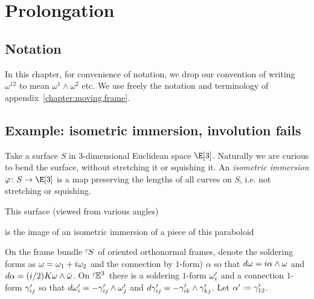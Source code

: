 \chapter{Prolongation}\label{chapter:prolongation}
%
\section{Notation}In this chapter, for convenience of notation, we drop our convention of writing \(\omega^{12}\) to mean \(\omega^1\wedge\omega^2\) etc.
We use freely the notation and terminology of appendix~\ref{chapter:moving.frame}. 
\section{Example: isometric immersion, involution fails}
Take a surface \(S\) in \(3\)-dimensional Euclidean space \(\E[3]\).
Naturally we are curious to bend the surface, without stretching it or squishing it.
An \emph{isometric immersion} \(\varphi \colon S \to \E[3]\) is a map preserving the lengths of all curves on \(S\), i.e. not stretching or squishing.
\begin{example}This surface (viewed from various angles)
\begin{center}
\end{center}
is the image of an isometric immersion of a piece of this paraboloid
\begin{center}
\end{center}
\end{example}
On the frame bundle \(\left\ulcorner\!S\right.\) of oriented orthonormal frames, denote the soldering forms as \(\omega=\omega_1+i\omega_2\) and the connection by \(1\)-form) \(\alpha\) so that \(d\omega=i\alpha \wedge \omega\) and \(d\alpha=(i/2)K\omega \wedge \bar{\omega}\).
On \(\left\ulcorner\!\mathbb{E}^{3}\right.\) there is a soldering \(1\)-form \(\omega'_i\) and a connection \(1\)-form \(\gamma'_{ij}\) so that \(d\omega'_i = -\gamma'_{ij} \wedge \omega'_j\) and \(d\gamma'_{ij} = -\gamma'_{ik} \wedge \gamma'_{kj}\).
Let \(\otalpha\defeq\qc_{12}\).

